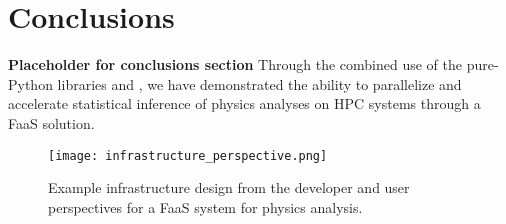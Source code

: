 \section{Conclusions}\label{sec:conclusions}

\textbf{Placeholder for conclusions section}
Through the combined use of the pure-Python libraries \funcX{} and \pyhf{}, we have demonstrated the ability to parallelize and accelerate statistical inference of physics analyses on HPC systems through a FaaS solution.

\begin{figure}[!htpb]
    \centering
    \texttt{[image: infrastructure\_perspective.png]}
    \caption{Example infrastructure design from the developer and user perspectives for a FaaS system for physics analysis.~\cite{portable_inference_workshop}}
    \label{fig:infrastructure_perspective}
\end{figure}
